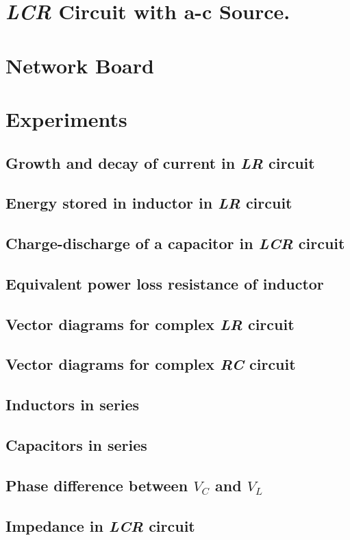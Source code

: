 \documentclass[12pt]{book}
\begin{document}
\section{\textit{LCR} Circuit with a-c Source.}
\section{Network Board}
\section{Experiments}
\subsection{Growth and decay of current in \textit{LR} circuit}
\subsection{Energy stored in inductor in \textit{LR} circuit}
\subsection{Charge-discharge of a capacitor in \textit{LCR} circuit}
\subsection{Equivalent power loss resistance of inductor}
\subsection{Vector diagrams for complex \textit{LR} circuit}
\subsection{Vector diagrams for complex \textit{RC} circuit}
\subsection{Inductors in series}
\subsection{Capacitors in series}
\subsection{Phase difference between $V_C$ and $V_L$}
\subsection{Impedance in \textit{LCR} circuit}
\end{document}
